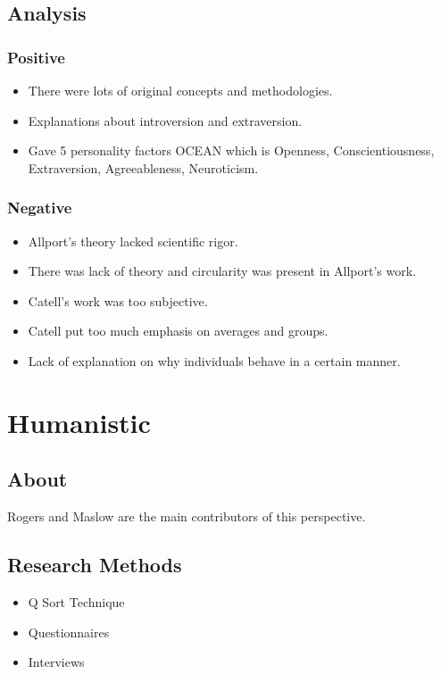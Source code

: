 \documentclass{article}
\begin{document}
		\subsection{Analysis}
			\subsubsection{Positive}
				\begin{itemize}
					\item There were lots of original concepts and methodologies.
					\item Explanations about introversion and extraversion.
					\item Gave 5 personality factors OCEAN which is Openness, Conscientiousness, Extraversion, Agreeableness, Neuroticism.

				\end{itemize}
			\subsubsection{Negative}
				\begin{itemize}
					\item Allport's theory lacked scientific rigor.
					\item There was lack of theory and circularity was present in Allport's work.
					\item Catell's work was too subjective.
					\item Catell put too much emphasis on averages and groups.
					\item Lack of explanation on why individuals behave in a certain manner.
				\end{itemize}

	\section{Humanistic}
		\subsection{About}
			Rogers and Maslow are the main contributors of this perspective.
		\subsection{Research Methods}
			\begin{itemize}
				\item Q Sort Technique
				\item Questionnaires
				\item Interviews
			\end{itemize}
\end{document}
